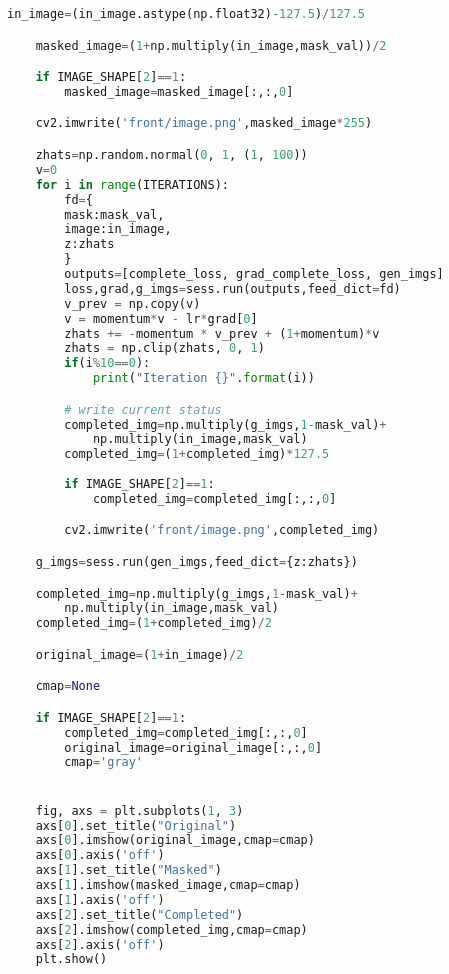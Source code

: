 \begin{lstlisting}[basicstyle=\scriptsize,language=Python]
    in_image=(in_image.astype(np.float32)-127.5)/127.5

    masked_image=(1+np.multiply(in_image,mask_val))/2

    if IMAGE_SHAPE[2]==1:
        masked_image=masked_image[:,:,0]

    cv2.imwrite('front/image.png',masked_image*255)

    zhats=np.random.normal(0, 1, (1, 100))
    v=0
    for i in range(ITERATIONS):
        fd={
        mask:mask_val,
        image:in_image,
        z:zhats
        }
        outputs=[complete_loss, grad_complete_loss, gen_imgs]
        loss,grad,g_imgs=sess.run(outputs,feed_dict=fd)
        v_prev = np.copy(v)
        v = momentum*v - lr*grad[0]
        zhats += -momentum * v_prev + (1+momentum)*v
        zhats = np.clip(zhats, 0, 1)
        if(i%10==0):
            print("Iteration {}".format(i))

        # write current status  
        completed_img=np.multiply(g_imgs,1-mask_val)+
            np.multiply(in_image,mask_val)
        completed_img=(1+completed_img)*127.5
        
        if IMAGE_SHAPE[2]==1:
            completed_img=completed_img[:,:,0]

        cv2.imwrite('front/image.png',completed_img)

    g_imgs=sess.run(gen_imgs,feed_dict={z:zhats})

    completed_img=np.multiply(g_imgs,1-mask_val)+
        np.multiply(in_image,mask_val)
    completed_img=(1+completed_img)/2

    original_image=(1+in_image)/2

    cmap=None

    if IMAGE_SHAPE[2]==1:
        completed_img=completed_img[:,:,0]
        original_image=original_image[:,:,0]            
        cmap='gray'


    fig, axs = plt.subplots(1, 3)
    axs[0].set_title("Original")
    axs[0].imshow(original_image,cmap=cmap)
    axs[0].axis('off')
    axs[1].set_title("Masked")
    axs[1].imshow(masked_image,cmap=cmap)
    axs[1].axis('off')
    axs[2].set_title("Completed")
    axs[2].imshow(completed_img,cmap=cmap)
    axs[2].axis('off')
    plt.show()

\end{lstlisting}



